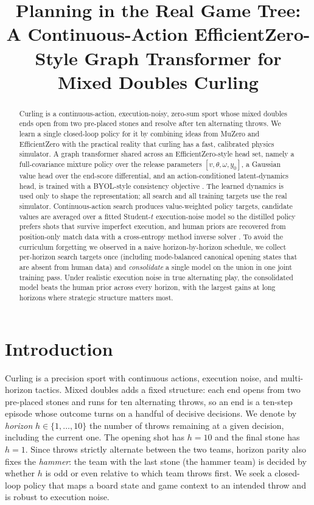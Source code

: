 \documentclass[11pt]{article}
\title{%
Planning in the Real Game Tree:\\
A Continuous-Action EfficientZero-Style Graph Transformer for Mixed Doubles Curling
}
\author{}
\date{}
\begin{document}
\maketitle

\begin{abstract}
Curling is a continuous-action, execution-noisy, zero-sum sport whose mixed
doubles ends open from two pre-placed stones and resolve after ten alternating
throws. We learn a single closed-loop policy for it by combining ideas from
MuZero \cite{schrittwieser2020mastering} and EfficientZero
\cite{ye2021mastering} with the practical reality that curling has a fast,
calibrated physics simulator. A graph transformer shared across an
EfficientZero-style head set, namely a full-covariance mixture policy over the
release parameters $[v,\theta,\omega,y_0]$, a Gaussian value head over the
end-score differential, and an action-conditioned latent-dynamics head, is
trained with a BYOL-style consistency objective \cite{grill2020bootstrap}.
The learned dynamics is used only to shape the representation; all search and
all training targets use the real simulator. Continuous-action search produces
value-weighted policy targets, candidate values are averaged over a fitted
Student-$t$ execution-noise model \cite{yee2016monte} so the distilled policy
prefers shots that survive imperfect execution, and human priors are recovered
from position-only match data with a cross-entropy method inverse solver
\cite{deboer2005tutorial}. To avoid the curriculum forgetting we observed in a
naive horizon-by-horizon schedule, we collect per-horizon search targets once
(including mode-balanced canonical opening states that are absent from human
data) and \emph{consolidate} a single model on the union in one joint
training pass. Under realistic execution noise in true alternating play, the
consolidated model beats the human prior across every horizon, with the
largest gains at long horizons where strategic structure matters most.
\end{abstract}

\section{Introduction}

Curling is a precision sport with continuous actions, execution noise, and
multi-horizon tactics. Mixed doubles adds a fixed structure: each end opens
from two pre-placed stones and runs for ten alternating throws, so an end is a
ten-step episode whose outcome turns on a handful of decisive decisions. We
denote by \emph{horizon} $h \in \{1, \ldots, 10\}$ the number of throws
remaining at a given decision, including the current one. The opening shot
has $h=10$ and the final stone has $h=1$. Since throws strictly alternate
between the two teams, horizon parity also fixes the \emph{hammer}: the team
with the last stone (the hammer team) is decided by whether $h$ is odd or
even relative to which team throws first. We seek a closed-loop policy that
maps a board state and game context to an intended throw and is robust to
execution noise.
\end{document}
